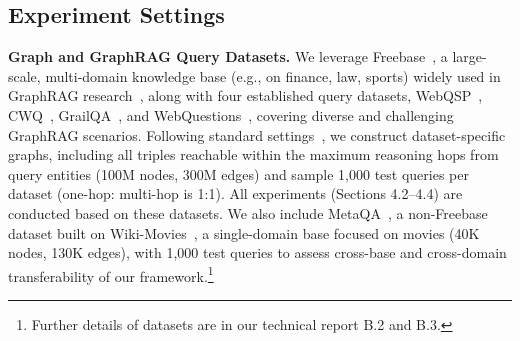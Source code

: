\subsection{Experiment Settings}





\textbf{Graph and GraphRAG Query Datasets.} 
We leverage Freebase~\cite{Freebase}, a large-scale, multi-domain knowledge base (e.g., on finance, law, sports) widely used in GraphRAG research~\cite{StructGPT,UniKGQA,KD-CoT,DecAF,RoG,ToG,GNN-RAG,ChatKBQA,GCR,LessIsMore}, along with four established query datasets, WebQSP~\cite{webqsp}, CWQ~\cite{CWQ}, GrailQA~\cite{GrailQA}, and WebQuestions~\cite{UHop}, covering diverse and challenging GraphRAG scenarios.
Following standard settings~\cite{NSM,ToG,UniKGQA,RoG}, we construct dataset-specific graphs, including all triples reachable within the maximum reasoning hops from query entities (100M nodes, 300M edges) and sample 1,000 test queries per dataset (one-hop: multi-hop is 1:1). All experiments (Sections 4.2–4.4) are conducted based on these datasets.
We also include MetaQA~\cite{MetaQA}, a non-Freebase dataset built on Wiki-Movies~\cite{ref:wikimovie}, a single-domain base focused on movies (40K nodes, 130K edges), with 1,000 test queries to assess cross-base and cross-domain transferability  of our framework.\footnote{Further details of datasets  are in our technical report B.2 and B.3.} 


